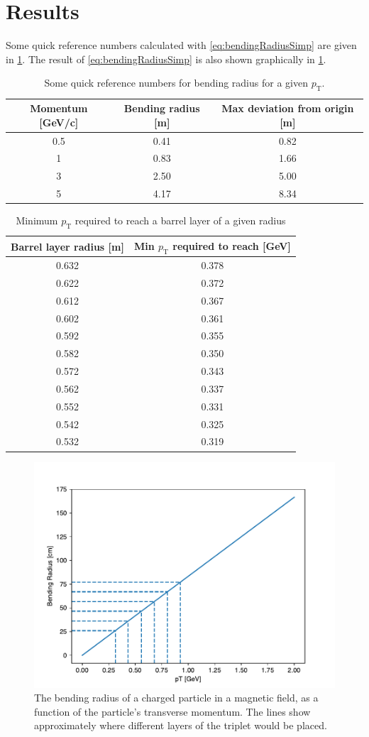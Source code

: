 \documentclass[a4paper, 12pt]{article}
\newcommand{\pt}{\ensuremath{p_{\mathrm{T}}}\xspace}
\begin{document}
\section{Results}
Some quick reference numbers calculated with \cref{eq:bendingRadiusSimp} are given in \cref{tab:brquick}. 
The result of \cref{eq:bendingRadiusSimp} is also shown graphically in \cref{fig:bendingRvP}.

\begin{table}
  \centering
  \begin{tabular}{ccc}
    \toprule
    Momentum [GeV/c] & Bending radius [m] & Max deviation from origin [m] \\ 
    \midrule
    0.5 & 0.41 & 0.82 \\
    1 & 0.83   & 1.66 \\ 
    3 & 2.50   & 5.00 \\ 
    5 & 4.17   & 8.34 \\ 
    \bottomrule
  \end{tabular}
  \caption{Some quick reference numbers for bending radius for a given \pt.}
  \label{tab:brquick}
\end{table}

\begin{table}
  \centering
  \begin{tabular}{cc}
    \toprule
    Barrel layer radius [m] & Min \pt required to reach [GeV] \\ 
    \midrule 
    0.632 & 0.378 \\
    0.622 & 0.372 \\
    0.612 & 0.367 \\
    0.602 & 0.361 \\
    0.592 & 0.355 \\
    0.582 & 0.350 \\
    0.572 & 0.343 \\
    0.562 & 0.337 \\
    0.552 & 0.331 \\ 
    0.542 & 0.325 \\
    0.532 & 0.319 \\
    \bottomrule
  \end{tabular}
  \caption{Minimum \pt required to reach a barrel layer of a given radius}
\end{table}



\begin{figure}
  \centering
\includegraphics[width=0.5\linewidth]{images/bendingRvP}
  \caption{The bending radius of a charged particle in a magnetic field, as a function of the particle's transverse momentum. 
  The lines show approximately where different layers of the triplet would be placed. }
  \label{fig:bendingRvP}
\end{figure}
\end{document}
